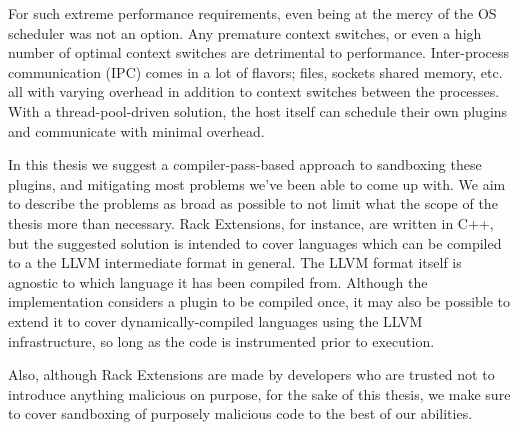 For such extreme performance requirements, even being at the mercy of the OS
scheduler was not an option.
Any premature context switches, or even a high number of optimal context
switches are detrimental to performance.
Inter-process communication (IPC) comes in a lot of flavors; files, sockets
shared memory, etc. all with varying overhead in addition to context switches
between the processes.
With a thread-pool-driven solution, the host itself can schedule their own
plugins and communicate with minimal overhead.

In this thesis we suggest a compiler-pass-based approach to sandboxing these
plugins, and mitigating most problems we've been able to come up with.
We aim to describe the problems as broad as possible to not limit what the scope
of the thesis more than necessary.
Rack Extensions, for instance, are written in C++, but the suggested solution is
intended to cover languages which can be compiled to a the LLVM intermediate
format in general.
The LLVM format itself is agnostic to which language it has been compiled from.
Although the implementation considers a plugin to be compiled once, it may also
be possible to extend it to cover dynamically-compiled languages using the LLVM
infrastructure, so long as the code is instrumented prior to execution.

Also, although Rack Extensions are made by developers who are trusted not to
introduce anything malicious on purpose, for the sake of this thesis, we make
sure to cover sandboxing of purposely malicious code to the best of our
abilities.
